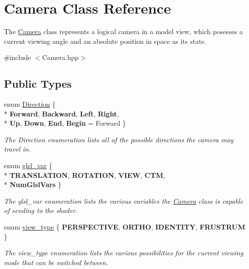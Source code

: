 \hypertarget{class_camera}{\section{Camera Class Reference}
\label{class_camera}
}


The \hyperlink{class_camera}{Camera} class represents a logical camera in a model view, which posesses a current viewing angle and an absolute position in space as its state.  




{\ttfamily \#include $<$Camera.\-hpp$>$}

\subsection*{Public Types}
\begin{DoxyCompactItemize}
\item 
enum \hyperlink{class_camera_a80cb65605322d27ad3b6d973484509ec}{Direction} \{ \\*
{\bfseries Forward}, 
{\bfseries Backward}, 
{\bfseries Left}, 
{\bfseries Right}, 
\\*
{\bfseries Up}, 
{\bfseries Down}, 
{\bfseries End}, 
{\bfseries Begin} =  Forward
 \}
\begin{DoxyCompactList}\small\item\em The Direction enumeration lists all of the possible directions the camera may travel in. \end{DoxyCompactList}\item 
enum \hyperlink{class_camera_a6ff726a75a430e4f17e5dec42e4d4405}{glsl\-\_\-var} \{ \\*
{\bfseries T\-R\-A\-N\-S\-L\-A\-T\-I\-O\-N}, 
{\bfseries R\-O\-T\-A\-T\-I\-O\-N}, 
{\bfseries V\-I\-E\-W}, 
{\bfseries C\-T\-M}, 
\\*
{\bfseries Num\-Glsl\-Vars}
 \}
\begin{DoxyCompactList}\small\item\em The glsl\-\_\-var enumeration lists the various variables the \hyperlink{class_camera}{Camera} class is capable of sending to the shader. \end{DoxyCompactList}\item 
enum \hyperlink{class_camera_afdccec6d447490dcc80ab6b99f21d0e5}{view\-\_\-type} \{ {\bfseries P\-E\-R\-S\-P\-E\-C\-T\-I\-V\-E}, 
{\bfseries O\-R\-T\-H\-O}, 
{\bfseries I\-D\-E\-N\-T\-I\-T\-Y}, 
{\bfseries F\-R\-U\-S\-T\-R\-U\-M}
 \}
\begin{DoxyCompactList}\small\item\em The view\-\_\-type enumeration lists the various possibilities for the current viewing mode that can be switched between. \end{DoxyCompactList}\end{DoxyCompactItemize}
